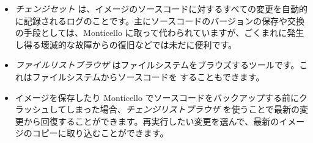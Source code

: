 \documentclass[a4paper,10pt,twoside]{book}
\begin{document}
\begin{itemize}
  \item \emph{チェンジセット} は、イメージのソースコードに対するすべての変更を自動的に記録されるログのことです。主にソースコードのバージョンの保存や交換の手段としては、Monticello に取って代わられていますが、ごくまれに発生し得る壊滅的な故障からの復旧などでは未だに便利です。
  \item \emph{ファイルリストブラウザ} はファイルシステムをブラウズするツールです。これはファイルシステムからソースコードを  することもできます。
  \item イメージを保存したり Monticello でソースコードをバックアップする前にクラッシュしてしまった場合、\emph{チェンジリストブラウザ} を使うことで最新の変更から回復することができます。再実行したい変更を選んで、最新のイメージのコピーに取り込むことができます。
\end{itemize}

\ifx\wholebook\relax\else
\end{document}
